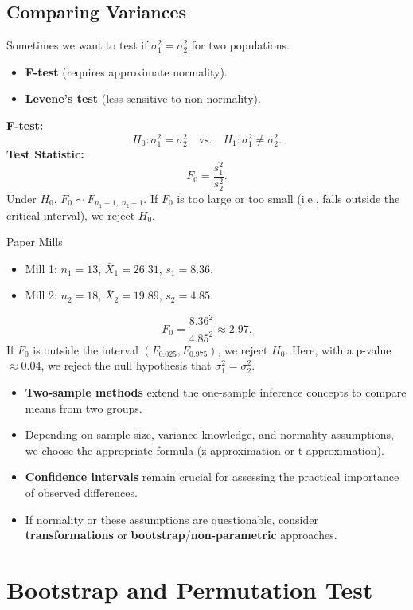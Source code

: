 \documentclass[10pt, total={6in, 8in}]{extarticle}
\begin{document}
\subsection{Comparing Variances}
Sometimes we want to test if $\sigma_1^2 = \sigma_2^2$ for two populations.
\begin{itemize}
    \item \textbf{F-test} (requires approximate normality).
    \item \textbf{Levene's test} (less sensitive to non-normality).
\end{itemize}
\textbf{F-test:}
$$
    H_0: \sigma_1^2 = \sigma_2^2 \quad \text{vs.} \quad H_1: \sigma_1^2 \neq \sigma_2^2.
$$
\textbf{Test Statistic:}
$$
    F_0 = \frac{s_1^2}{s_2^2}.
$$
Under $H_0$, $F_0 \sim F_{n_1-1,\;n_2-1}$. If $F_0$ is too large or too small (i.e., falls outside the critical interval), we reject $H_0$.
\begin{examplebox}{Paper Mills}{}
    \begin{itemize}
        \item Mill 1: $n_1=13$, $\bar{X}_1=26.31$, $s_1=8.36$.
        \item Mill 2: $n_2=18$, $\bar{X}_2=19.89$, $s_2=4.85$.
    \end{itemize}
    $$
        F_0 = \frac{8.36^2}{4.85^2} \approx 2.97.
    $$
    If $F_0$ is outside the interval $(F_{0.025}, F_{0.975})$, we reject $H_0$. Here, with a p-value $\approx 0.04$, we reject the null hypothesis that $\sigma_1^2=\sigma_2^2$.
\end{examplebox}
\begin{takeaway-box}{}{}
\begin{itemize}
    \item \textbf{Two-sample methods} extend the one-sample inference concepts to compare means from two groups.
    \item Depending on sample size, variance knowledge, and normality assumptions, we choose the appropriate formula (z-approximation or t-approximation).
    \item \textbf{Confidence intervals} remain crucial for assessing the practical importance of observed differences.
    \item If normality or these assumptions are questionable, consider \textbf{transformations} or \textbf{bootstrap}/\textbf{non-parametric} approaches.
\end{itemize}
\end{takeaway-box}

\section{Bootstrap and Permutation Test}
\end{document}
